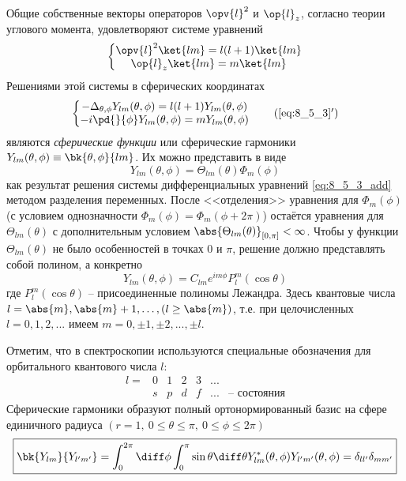 Общие собственные векторы операторов $\opv{l}^2$ и $\op{l}_z$, согласно теории углового момента, удовлетворяют системе уравнений
\begin{equation}
\label{eq:8_5_3}
\left\{
  \begin{matrix}
    \opv{l}^2 \ket{lm} = l(l+1)\ket{lm} \\
    \op{l}_z \ket{lm} = m \ket{lm}
  \end{matrix}
\right.
\end{equation}%
%
Решениями этой системы в сферических координатах
\begin{equation}
\left\{
  \begin{matrix}
  \label{eq:8_5_3_add}
   - \Delta_{\theta, \phi} Y_{lm}(\theta, \phi) = l(l+1) Y_{lm}(\theta, \phi) 
    \\
     -i\pd{}{\phi} Y_{lm}(\theta, \phi) = m Y_{lm}(\theta, \phi) 
  \end{matrix}
\right .
\tag{\ref{eq:8_5_3}$'$}
\end{equation}%
%
являются {\em сферические функции} или {сферические гармоники} $Y_{lm}(\theta, \phi) \equiv \bk{\theta, \phi}{lm}$. Их можно представить в виде
$$
Y_{lm}(\theta, \phi) = \Theta_{lm}(\theta) \Phi_m(\phi)
$$%
%
как результат решения системы дифференциальных уравнений \eqref{eq:8_5_3_add} методом разделения переменных. После <<отделения>> уравнения для $\Phi_m(\phi)$ (с условием однозначности $\Phi_m(\phi) = \Phi_m(\phi + 2\pi)$) остаётся уравнения для $\Theta_{lm}(\theta)$ с дополнительным условием $\abs{\Theta_{lm}(\theta)}_{[0,\pi]} < \infty$. Чтобы у функции $\Theta_{lm}(\theta)$ не было особенностей в точках $0$ и $\pi$, решение должно представлять собой полином, а конкретно
$$
\boxed{
  Y_{lm}(\theta, \phi) = C_{lm} e^{im\phi} P^m_l(\cos \theta)
}
$$%
%
где  $P^m_l(\cos \theta)$ -- присоединенные полиномы Лежандра\footnotemark. Здесь квантовые числа $l = \abs{m}, \abs{m} + 1, \dots, (l \ge \abs{m})$, т.е. при целочисленных $l = 0, 1, 2, ...$ имеем $m = 0, \pm 1, \pm 2, ..., \pm l$.

Отметим, что в спектроскопии используются специальные обозначения для орбитального квантового числа $l$:
$$
\begin{matrix}
l =  & 0 & 1 & 2 & 3 & ... & \\
       & s & p & d & f & ... & \text{-- состояния}
\end{matrix}
$$%
%
Сферические гармоники образуют полный ортонормированный базис на сфере единичного радиуса $(r = 1,~0 \leqslant \theta \leqslant \pi,~0 \leqslant \phi \leqslant 2\pi)$
\begin{equation}
\label{eq:8_5_4}
\boxed{\bk{Y_{lm}}{Y_{l'm'}} = \int_0^{2\pi} \diff\phi \int_0^\pi \sin \theta \diff\theta Y^*_{lm}(\theta, \phi) Y_{l'm'}(\theta, \phi) = \delta_{ll'} \delta_{mm'}}
\end{equation}